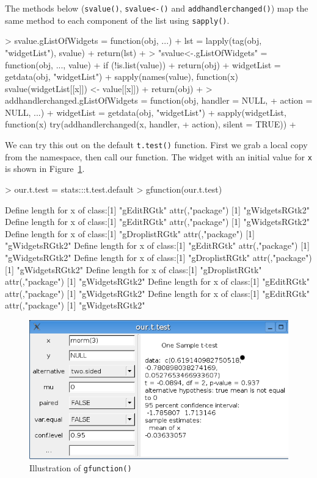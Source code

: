 \documentclass[12pt]{article}
\newcommand{\RCode}[1]{\texttt{#1}}
\newcommand{\RFunc}[1]{\texttt{#1()}}
\begin{document}
The methods below (\RFunc{svalue}, \RFunc{svalue<-} and
\RFunc{addhandlerchanged})  map the same method to each component
of the list using \RFunc{sapply}.

\begin{Schunk}
\begin{Sinput}
> svalue.gListOfWidgets = function(obj, ...) {
+     lst = lapply(tag(obj, "widgetList"), svalue)
+     return(lst)
+ }
> "svalue<-.gListOfWidgets" = function(obj, ..., value) {
+     if (!is.list(value)) 
+         return(obj)
+     widgetList = getdata(obj, "widgetList")
+     sapply(names(value), function(x) svalue(widgetList[[x]]) <- value[[x]])
+     return(obj)
+ }
> addhandlerchanged.gListOfWidgets = function(obj, handler = NULL, 
+     action = NULL, ...) {
+     widgetList = getdata(obj, "widgetList")
+     sapply(widgetList, function(x) try(addhandlerchanged(x, handler, 
+         action), silent = TRUE))
+ }
\end{Sinput}
\end{Schunk}

We can try this out on the default \RFunc{t.test} function. First we
grab a local copy from the namespace, then call our function. The
widget with an initial value for \RCode{x} is shown in
Figure~\ref{fig:gfunction}.


\begin{Schunk}
\begin{Sinput}
> our.t.test = stats:::t.test.default
> gfunction(our.t.test)
\end{Sinput}
\begin{Soutput}
Define length for x of class:[1] "gEditRGtk"
attr(,"package")
[1] "gWidgetsRGtk2"
Define length for x of class:[1] "gEditRGtk"
attr(,"package")
[1] "gWidgetsRGtk2"
Define length for x of class:[1] "gDroplistRGtk"
attr(,"package")
[1] "gWidgetsRGtk2"
Define length for x of class:[1] "gEditRGtk"
attr(,"package")
[1] "gWidgetsRGtk2"
Define length for x of class:[1] "gDroplistRGtk"
attr(,"package")
[1] "gWidgetsRGtk2"
Define length for x of class:[1] "gDroplistRGtk"
attr(,"package")
[1] "gWidgetsRGtk2"
Define length for x of class:[1] "gEditRGtk"
attr(,"package")
[1] "gWidgetsRGtk2"
Define length for x of class:[1] "gEditRGtk"
attr(,"package")
[1] "gWidgetsRGtk2"
\end{Soutput}
\end{Schunk}

\begin{figure}[htbp]
  \centering
  \includegraphics[width=.6\textwidth]{gfunction}
  \caption{Illustration of \RFunc{gfunction}}
  \label{fig:gfunction}
\end{figure}
\end{document}

